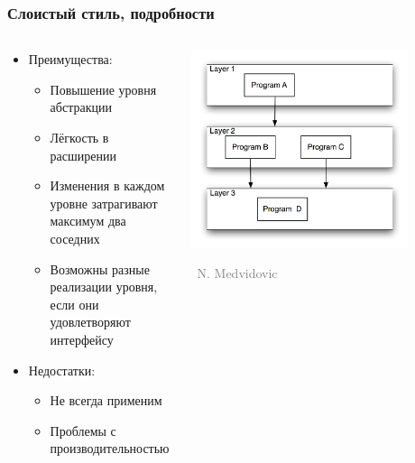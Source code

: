 \documentclass[xetex,mathserif,serif]{beamer}
\newcommand{\attribution}[1] {
    \vspace{-5mm}\begin{flushright}\begin{scriptsize}\textcolor{gray}{\textcopyright\, #1}\end{scriptsize}\end{flushright}
}
\begin{document}
    \begin{frame}
        \frametitle{Слоистый стиль, подробности}
        \begin{columns}
            \begin{column}{0.5\textwidth}
                \begin{itemize}
                    \item Преимущества:
                    \begin{itemize}
                        \item Повышение уровня абстракции
                        \item Лёгкость в расширении
                        \item Изменения в каждом уровне затрагивают максимум два соседних
                        \item Возможны разные реализации уровня, если они удовлетворяют интерфейсу
                    \end{itemize}
                    \item Недостатки:
                    \begin{itemize}
                        \item Не всегда применим
                        \item Проблемы с производительностью
                    \end{itemize}
                \end{itemize}
            \end{column}
            \begin{column}{0.5\textwidth}
                \begin{center}
                    \includegraphics[width=0.8\textwidth]{layered.png}
                    \attribution{N. Medvidovic}
                \end{center}
            \end{column}
        \end{columns}
    \end{frame}
\end{document}
